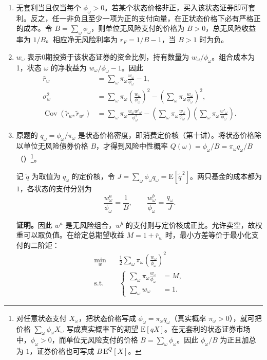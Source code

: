 \begin{solution}[blank-type=manual,blank-vsep=9\baselineskip]
\begin{enumerate}[label=(\alph*)]
\item 无套利当且仅当每个 $\phi_\omega>0$。若某个状态价格非正，买入该状态证券即可套利。反之，任一非负且至少一项为正的支付向量，在正状态价格下必有严格正的成本。令 $B=\sum_\omega\phi_\omega$，则单位无风险支付的价格为 $B>0$，总无风险收益率为 $1/B$。相应净无风险利率为 $r_F=1/B-1$，当 $B>1$ 时为负。

\item $w_\omega$ 表示0期投资于该状态证券的资金比例，持有数量为 $w_\omega/\phi_\omega$。组合成本为1，状态 $\omega$ 的净收益为 $w_\omega/\phi_\omega-1$。因此
\[
 \begin{aligned}
 \bar r_w&=\sum_\omega\pi_\omega\frac{w_\omega}{\phi_\omega}-1,\\
 \sigma_w^2&=\sum_\omega\pi_\omega\left(\frac{w_\omega}{\phi_\omega}\right)^2
 -\left(\sum_\omega\pi_\omega\frac{w_\omega}{\phi_\omega}\right)^2,\\
 \operatorname{Cov}(\widetilde r_w,\widetilde r_{w'})
 &=\sum_\omega\pi_\omega\frac{w_\omega w'_\omega}{\phi_\omega^2}
 -\left(\sum_\omega\pi_\omega\frac{w_\omega}{\phi_\omega}\right)
 \left(\sum_\omega\pi_\omega\frac{w'_\omega}{\phi_\omega}\right).
 \end{aligned}
\]

\item 原题的 $q_\omega=\phi_\omega/\pi_\omega$ 是状态价格密度，即消费定价核\ifdefined\WJHandoutKnowledge（第十讲）\fi。将状态价格除以单位无风险债券价格 $B$，才得到风险中性概率 $Q(\omega)=\phi_\omega/B=\pi_\omega q_\omega/B$\ifdefined\WJHandoutKnowledge（）\fi\footnote{对任意状态支付 $X_\omega$，把状态价格写成 $\phi_\omega=\pi_\omega q_\omega$（真实概率 $\pi_\omega>0$），就可把价格 $\sum_\omega\phi_\omega X_\omega$ 写成真实概率下的期望 $\mathrm E[qX]$。在无套利的状态证券市场中，$\phi_\omega>0$，而单位无风险支付的价格 $B=\sum_\omega\phi_\omega$。因此 $\phi_\omega/B$ 为正且加总为 $1$，证券价格也可写成 $B\,\mathrm E^Q[X]$。}。

记 $\widetilde q$ 为取值为 $q_\omega$ 的定价核，令 $J=\sum_\omega\phi_\omega q_\omega=\mathrm E[\widetilde q^{\,2}]$。两只基金的成本都为 $1$，各状态的支付分别为
\[
 \frac{w^a_\omega}{\phi_\omega}=\frac1B,\qquad
 \frac{w^b_\omega}{\phi_\omega}=\frac{q_\omega}{J}.
\]

\textbf{证明。}因此 $w^a$ 是无风险组合，$w^b$ 的支付则与定价核成正比。允许卖空，故权重可以取负值。在给定总期望收益 $M=1+\bar r_w$ 时，最小方差等价于最小化支付的二阶矩：
\[
 \begin{aligned}
 \min_w\quad &\frac12\sum_\omega\pi_\omega\left(\frac{w_\omega}{\phi_\omega}\right)^2\\
 \text{s.t.}\quad &
 \left\{\begin{aligned}
 \sum_\omega\pi_\omega\frac{w_\omega}{\phi_\omega}&=M,\\
 \sum_\omega w_\omega&=1.
 \end{aligned}\right.
 \end{aligned}
\]


\end{enumerate}
\end{solution}
